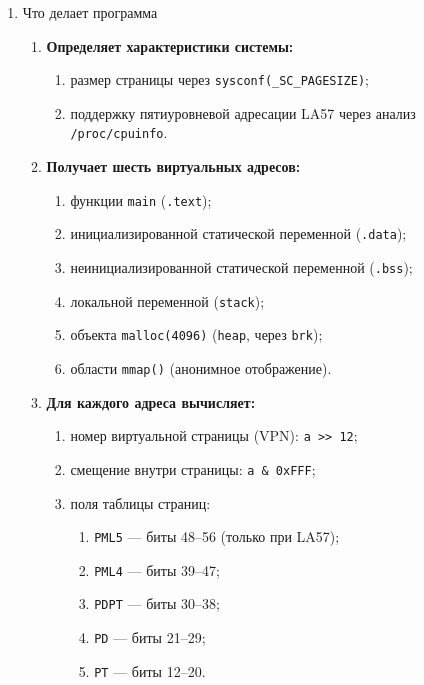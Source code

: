 \begin{enumerate}
\item Что делает программа

\begin{enumerate}
    \item \textbf{Определяет характеристики системы:}
    \begin{enumerate}
        \item размер страницы через \texttt{sysconf(\_SC\_PAGESIZE)};
        \item поддержку пятиуровневой адресации LA57 через анализ
        \texttt{/proc/cpuinfo}.
    \end{enumerate}
    
    \item \textbf{Получает шесть виртуальных адресов:}
    \begin{enumerate}
        \item функции \texttt{main} (\texttt{.text});
        \item инициализированной статической переменной (\texttt{.data});
        \item неинициализированной статической переменной (\texttt{.bss});
        \item локальной переменной (\texttt{stack});
        \item объекта \texttt{malloc(4096)} (\texttt{heap}, через \texttt{brk});
        \item области \texttt{mmap()} (анонимное отображение).
    \end{enumerate}
    
    \item \textbf{Для каждого адреса вычисляет:}
    \begin{enumerate}
        \item номер виртуальной страницы (VPN): \texttt{a >> 12};
        \item смещение внутри страницы: \texttt{a \& 0xFFF};
        \item поля таблицы страниц:
        \begin{enumerate}
            \item \texttt{PML5} — биты 48--56 (только при LA57);
            \item \texttt{PML4} — биты 39--47;
            \item \texttt{PDPT} — биты 30--38;
            \item \texttt{PD} — биты 21--29;
            \item \texttt{PT} — биты 12--20.
        \end{enumerate}
    \end{enumerate}
    

\end{enumerate}
\end{enumerate}
